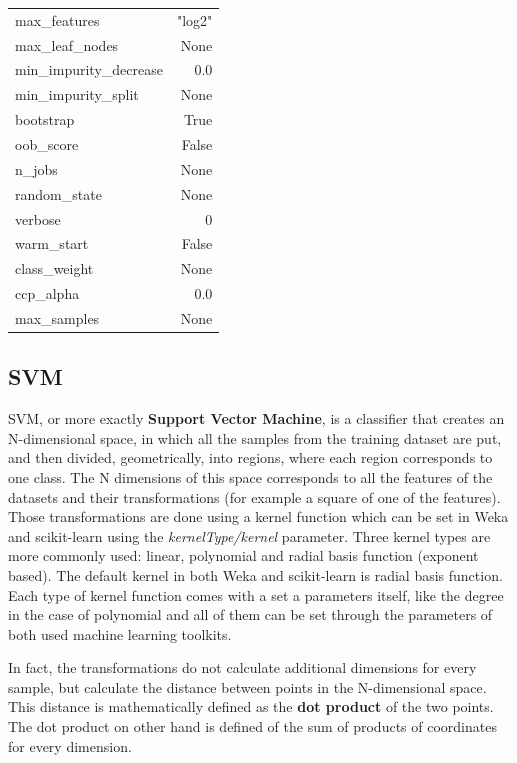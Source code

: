\begin{table}[H]
\begin{subtable}[t]{.5\linewidth}
\begin{tabular}{lr}
            max\_features & "log2" \\
            max\_leaf\_nodes & None \\
            min\_impurity\_decrease & 0.0 \\
            min\_impurity\_split & None \\
            bootstrap & True \\
            oob\_score & False \\
            n\_jobs & None \\
            random\_state & None \\
            verbose & 0 \\
            warm\_start & False \\
            class\_weight & None \\
            ccp\_alpha & 0.0 \\
            max\_samples & None \\\bottomrule
        \end{tabular}
    \end{subtable}%
\end{table}

\subsection{SVM}

SVM, or more exactly \textbf{Support Vector Machine}, is a classifier that creates an N-dimensional space, in which all the samples from the training dataset are put, and then divided, geometrically, into regions, where each region corresponds to one class. The N dimensions of this space corresponds to all the features of the datasets and their transformations (for example a square of one of the features). Those transformations are done using a kernel function which can be set in Weka and scikit-learn using the \textit{kernelType/kernel} parameter. Three kernel types are more commonly used: linear, polynomial and radial basis function (exponent based). The default kernel in both Weka and scikit-learn is radial basis function. Each type of kernel function comes with a set a parameters itself, like the degree in the case of polynomial and all of them can be set through the parameters of both used machine learning toolkits.

In fact, the transformations do not calculate additional dimensions for every sample, but calculate the distance between points in the N-dimensional space. This distance is mathematically defined as the \textbf{dot product} of the two points. The dot product on other hand is defined of the sum of products of coordinates for every dimension. 

